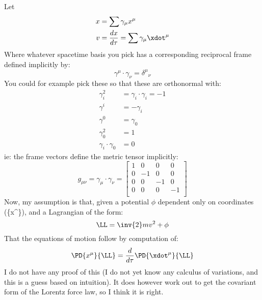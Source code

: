 %
%

%
%
\label{chap:massVaryLagrangian}

\section{}
%
Let
\begin{equation}\label{eqn:massVaryLagrangian:20}
\begin{aligned}
x &= \sum \gamma_{\mu} {x}^{\mu} \\
v &= \frac{dx}{d\tau} = \sum \gamma_{\mu} \xdot^{\mu}
\end{aligned}
\end{equation}
%
Where whatever spacetime basis you pick has a corresponding reciprocal frame defined implicitly by:
%
\begin{equation*}
\gamma^{\mu} \cdot \gamma_{\nu} = {\delta^{\mu}}_{\nu}
\end{equation*}
%
You could for example pick these so that these are orthonormal with:
%
\begin{equation}\label{eqn:massVaryLagrangian:40}
\begin{aligned}
\gamma_{i}^2 &= \gamma_i \cdot \gamma_i = -1 \\
\gamma^{i} &= -\gamma_{i} \\
\gamma^{0} &= \gamma_{0} \\
\gamma_{0}^2 &= 1 \\
\gamma_{i} \cdot \gamma_0 &= 0
\end{aligned}
\end{equation}
%
ie: the frame vectors define the metric tensor implicitly:
%
\begin{equation}\label{eqn:massvary:minkowski}
g_{\mu\nu} = \gamma_{\mu} \cdot \gamma_{\nu} =
\begin{bmatrix}
1 & 0 & 0 & 0 \\
0 & -1 & 0 & 0 \\
0 & 0 & -1 & 0 \\
0 & 0 & 0 & -1 \\
\end{bmatrix}
\end{equation}
%
Now, my assumption is that, given a potential $\phi$ dependent only on coordinates (\{x^\mu\}), and a Lagrangian of the form:
%
\begin{equation}
\LL = \inv{2} m v^2 + \phi
\end{equation}
%
That the equations of motion follow by computation of:
%
\begin{equation}
\PD{x^{\mu}}{\LL} = \frac{d}{d\tau} \PD{\xdot^{\mu}}{\LL}
\end{equation}
%
I do not have any proof of this (I do not yet know any calculus of variations, and this is a guess based on intuition).  It does however work out to get the covariant form of the Lorentz force law, so I think it is right.

